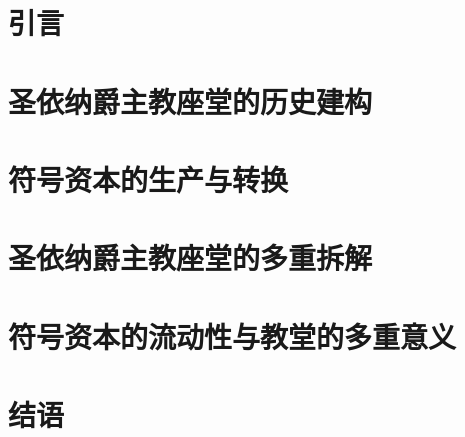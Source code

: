 \documentclass[
    lang=cn,
]{spArticle}
\date{}
\begin{document}
    \section{引言}
    \lipsum[1]

    \section{圣依纳爵主教座堂的历史建构}
    \lipsum[2]

    \section{符号资本的生产与转换}
    \lipsum[3]

    \section{圣依纳爵主教座堂的多重拆解}
    \lipsum[4]

    \section{符号资本的流动性与教堂的多重意义}
    \lipsum[5]

    \section{结语}
    \lipsum[6]
\end{document}

